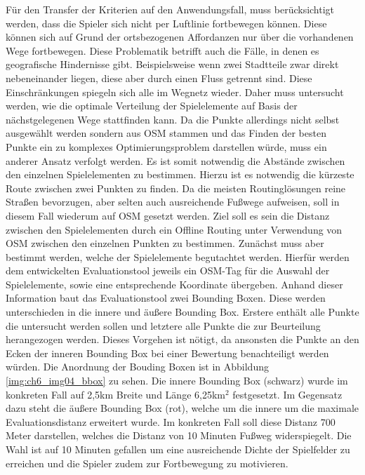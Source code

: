 Für den Transfer der Kriterien auf den Anwendungsfall, muss berücksichtigt werden, dass die Spieler sich nicht per Luftlinie fortbewegen können. Diese können sich auf Grund der ortsbezogenen Affordanzen nur über die vorhandenen Wege fortbewegen. Diese Problematik betrifft auch die Fälle, in denen es geografische Hindernisse gibt. Beispielsweise wenn zwei Stadtteile zwar direkt nebeneinander liegen, diese aber durch einen Fluss getrennt sind. Diese Einschränkungen spiegeln sich alle im Wegnetz wieder. Daher muss untersucht werden, wie die optimale Verteilung der Spielelemente auf Basis der nächstgelegenen Wege stattfinden kann. Da die Punkte allerdings nicht selbst ausgewählt werden sondern aus OSM stammen und das Finden der besten Punkte ein zu komplexes Optimierungsproblem darstellen würde, muss ein anderer Ansatz verfolgt werden. Es ist somit notwendig die Abstände zwischen den einzelnen Spielelementen  zu bestimmen. Hierzu ist es notwendig die kürzeste Route zwischen zwei Punkten zu finden.
Da die meisten Routinglösungen reine Straßen bevorzugen, aber selten auch ausreichende Fußwege aufweisen, soll in diesem Fall wiederum auf OSM gesetzt werden.
Ziel soll es sein die Distanz zwischen den Spielelementen durch ein Offline Routing unter Verwendung von OSM zwischen den einzelnen Punkten zu bestimmen.
Zunächst muss aber bestimmt werden, welche der Spielelemente begutachtet werden. Hierfür werden dem entwickelten Evaluationstool jeweils ein OSM-Tag für die Auswahl der Spielelemente, sowie eine entsprechende Koordinate übergeben. Anhand dieser Information baut das Evaluationstool zwei Bounding Boxen. Diese werden unterschieden in die innere und äußere Bounding Box. Erstere enthält alle Punkte die untersucht werden sollen und letztere alle Punkte die zur Beurteilung herangezogen werden. Dieses Vorgehen ist nötigt, da ansonsten die Punkte an den Ecken der inneren Bounding Box bei einer Bewertung benachteiligt werden würden.
Die Anordnung der Bouding Boxen ist in Abbildung \ref{img:ch6_img04_bbox} zu sehen.
Die innere Bounding Box (schwarz) wurde im konkreten Fall auf 2,5km Breite und Länge 6,25km$^2$ festgesetzt. Im Gegensatz dazu steht die äußere Bounding Box (rot), welche um die innere um die maximale Evaluationsdistanz erweitert wurde. Im konkreten Fall soll diese Distanz 700 Meter darstellen, welches die Distanz von 10 Minuten Fußweg widerspiegelt. Die Wahl ist auf 10 Minuten gefallen um eine ausreichende Dichte der Spielfelder zu erreichen und die Spieler zudem zur Fortbewegung zu motivieren.



